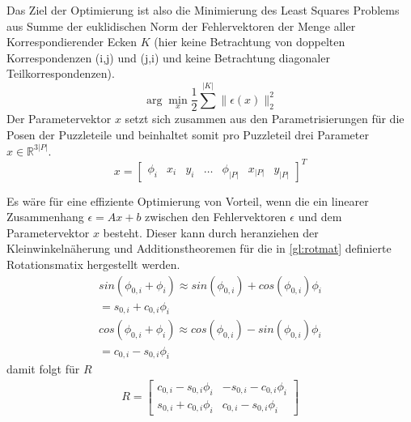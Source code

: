 Das Ziel der Optimierung ist also die Minimierung des Least Squares Problems aus Summe der euklidischen Norm der Fehlervektoren der Menge aller Korrespondierender Ecken $K$ (hier keine Betrachtung von doppelten Korrespondenzen (i,j) und (j,i) und keine Betrachtung diagonaler Teilkorrespondenzen).
\begin{equation}
    \arg\min_x \frac{1}{2} \sum^{|K|} \lVert \epsilon(x) \rVert_2^2 \label{gl:leastsquare}
\end{equation}
Der Parametervektor $x$ setzt sich zusammen aus den Parametrisierungen für die Posen der Puzzleteile und beinhaltet somit pro Puzzleteil drei Parameter $x \in \mathbb{R}^{3|P|}$.
\begin{equation}
    x = \begin{bmatrix}
        \phi_i & x_i & y_i & \dots & \phi_{|P|} & x_{|P|} & y_{|P|}
    \end{bmatrix}^T
\end{equation}

Es wäre für eine effiziente Optimierung von Vorteil, wenn die ein linearer Zusammenhang $\epsilon = Ax+b$ zwischen den Fehlervektoren $\epsilon$ und dem Parametervektor $x$ besteht. Dieser kann durch heranziehen der Kleinwinkelnäherung und Additionstheoremen für die in \autoref{gl:rotmat} definierte Rotationsmatix hergestellt werden.
\begin{gather}
    sin(\phi_{0,i} + \phi_{i}) \approx sin(\phi_{0,i}) + cos(\phi_{0,i}) \phi_{i} \nonumber\\
                                    = s_{0,i} + c_{0,i} \phi_{i}\\
    cos(\phi_{0,i} + \phi_{i}) \approx cos(\phi_{0,i}) - sin(\phi_{0,i}) \phi_{i} \nonumber\\
                                    = c_{0,i} - s_{0,i} \phi_{i}
\end{gather}
damit folgt für $R$
\begin{gather}
    R = \begin{bmatrix}
        c_{0,i} - s_{0,i} \phi_{i} & -s_{0,i} - c_{0,i} \phi_{i}\\
        s_{0,i} + c_{0,i} \phi_{i} & c_{0,i} - s_{0,i} \phi_{i}
    \end{bmatrix} \label{approx_rot}
\end{gather}

